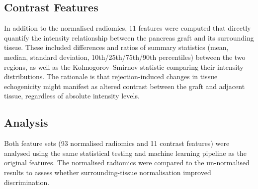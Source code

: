 \subsection{Contrast Features}

In addition to the normalised radiomics, 11 features were computed that directly quantify the intensity relationship between the pancreas graft and its surrounding tissue. These included differences and ratios of summary statistics (mean, median, standard deviation, 10th/25th/75th/90th percentiles) between the two regions, as well as the Kolmogorov--Smirnov statistic comparing their intensity distributions. The rationale is that rejection-induced changes in tissue echogenicity might manifest as altered contrast between the graft and adjacent tissue, regardless of absolute intensity levels.

\subsection{Analysis}

Both feature sets (93 normalised radiomics and 11 contrast features) were analysed using the same statistical testing and machine learning pipeline as the original features. The normalised radiomics were compared to the un-normalised results to assess whether surrounding-tissue normalisation improved discrimination.

\newpage
